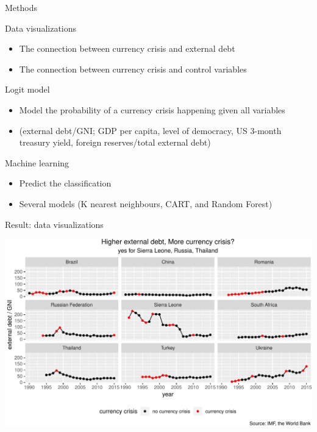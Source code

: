 \documentclass[ignorenonframetext,]{beamer}
\providecommand{\tightlist}{%
  \setlength{\itemsep}{0pt}\setlength{\parskip}{0pt}}
\begin{document}
\begin{frame}{Methods}

Data visualizations

\begin{itemize}
\tightlist
\item
  The connection between currency crisis and external debt
\item
  The connection between currency crisis and control variables
\end{itemize}

Logit model

\begin{itemize}
\tightlist
\item
  Model the probability of a currency crisis happening given all
  variables
\item
  (external debt/GNI; GDP per capita, level of democracy, US 3-month
  treasury yield, foreign reserves/total external debt)
\end{itemize}

Machine learning

\begin{itemize}
\tightlist
\item
  Predict the classification
\item
  Several models (K nearest neighbours, CART, and Random Forest)
\end{itemize}

\end{frame}

\begin{frame}{Result: data visualizations}

\begin{center}\includegraphics{beamer-pre_files/figure-beamer/unnamed-chunk-5-1} \end{center}

\end{frame}
\end{document}
